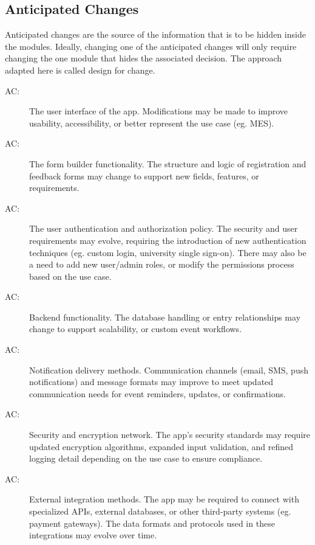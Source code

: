 \documentclass[12pt, titlepage]{article}
\newcounter{acnum}
\newcommand{\actheacnum}{AC\theacnum}
\begin{document}
\subsection{Anticipated Changes} \label{SecAchange}

Anticipated changes are the source of the information that is to be hidden
inside the modules. Ideally, changing one of the anticipated changes will only
require changing the one module that hides the associated decision. The approach
adapted here is called design for change.

\begin{description}
\item[ \actheacnum \label{acUI}:] 
  The user interface of the app. Modifications may be made to improve usability, accessibility, or better represent the use case (eg. MES).
\item[ \actheacnum \label{acForms}:] 
  The form builder functionality. The structure and logic of registration and feedback forms may change to support new fields, features, or requirements.
\item[ \actheacnum \label{acAuth}:] 
  The user authentication and authorization policy. The security and user requirements may evolve, requiring the introduction of new authentication techniques (eg. custom login, university single sign-on). There may also be a need to add new user/admin roles, or modify the permissions process based on the use case.
\item[ \actheacnum \label{acData}:] 
  Backend functionality. The database handling or entry relationships may change to support scalability, or custom event workflows.
\item[ \actheacnum \label{acNotifications}:] 
  Notification delivery methods. Communication channels (email, SMS, push notifications) and message formats may improve to meet updated communication needs for event reminders, updates, or confirmations.
\item[ \actheacnum \label{acSecurity}:] 
  Security and encryption network. The app's security standards may require updated encryption algorithms, expanded input validation, and refined logging detail depending on the use case to ensure compliance.
\item[ \actheacnum \label{acIntegration}:] 
  External integration methods. The app may be required to connect with specialized APIs, external databases, or other third-party systems (eg. payment gateways). The data formats and protocols used in these integrations may evolve over time.
\end{description}
\end{document}
